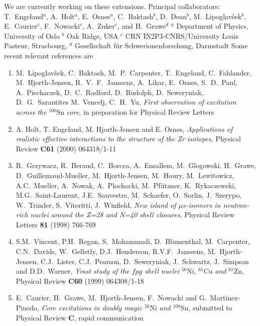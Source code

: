 We are currently working on these extensions. 
\newline\newline 
Principal collaborators: T.\ Engeland$^a$, 
A.\ Holt$^a$, E.\ Osnes$^a$, C.\ Baktash$^b$, D.\ Dean$^b$, M.\ Lipoglav\v{s}ek$^b$, E.\ Caurier$^c$, F.~Nowacki$^c$, A.\ Zuker$^c$, 
and H.\ Grawe$^d$\newline
${}^a$ Department of Physics,
University of Oslo\newline
${}^b$ Oak Ridge, USA\newline
${}^c$ CRN IN2P3-CNRS/University Louis Pasteur, Strasbourg, \newline
${}^d$ Gesellschaft f\"ur Schwerionenforschung,
Darmstadt\newline\newline
Some recent relevant references are
\begin{enumerate}
\item 
M.~Lipoglav\v{s}ek, C.~Baktash,
M.~P.~Carpenter, T.~Engeland, C.~Fahlander,
M.~Hjorth-Jensen, R.~V.~F.~Janssens, A.~Likar,
E.~Osnes, S.~D.~Paul, A.~Piechaczek, D.~C.~Radford,
D.~Rudolph, D.~Seweryniak, D.~G.~Sarantites M.~Vencelj, C.~H.~Yu,
{\em First observation of excitation across the} $^{100}$Sn 
{\em core}, in preparation
for Physical Review Letters
\item
    A. Holt, T. Engeland, M. Hjorth-Jensen and E. Osnes,
    {\em Applications of realistic effective interactions to the structure
         of the Zr isotopes},
    Physical Review {\bf C61} (2000) 064318/1-11
\item 
    R.\ Grzywacz, R.\ Beraud, C.\ Borcea, A.\ Ensallem, M.\ Glogowski,  H.\ Grawe, D.\ Guillemaud-Mueller, M.\ Hjorth-Jensen, M.\ Houry,
  M.\ Lewitowicz, A.C.\ Mueller, A.\ Nowak, A.\ Plochocki, 
  M.\ Pf\"utzner, K.\ Rykaczewski, M.G.\ Saint-Laurent, J.E.\ Sauvestre, M.\ Schaefer, O.\ Sorlin, J.\ Szerypo, W.\ Trinder, S.\ Viteritti, J.\ Winfield,
  {\em New island of $\mu s$-isomers in neutron-rich nuclei around the
  Z=28 and N=40 shell closures}, 
  Physical Review Letters {\bf 81} (1998) 766-769 
\item S.M.\ Vincent, P.H.\ Regan, S.\ Mohammadi, D.\ Blumenthal,
      M.\ Carpenter, C.N.\ Davids, W.\ Gelletly, D.J.\ Henderson,
      R.V.F.\ Janssens, M.\ Hjorth-Jensen, C.J.\ Lister, C.J.\ Pearson,
      D.\ Seweryniak, J.\ Schwartz, J.\ Simpson and D.D.\ Warner,
      {\em Yrast study of the $fpg$ shell nuclei} $^{56}$Ni, $^{61}$Cu
      {\em and} $^{61}$Zn,  Physical Review {\bf C60} (1999) 064308/1-18

\item E.\ Caurier, H.\ Grawe, M.\ Hjorth-Jensen, F.\ Nowacki and G.\ 
      Martinez-Pinedo, {\em Core excitations in doubly magic} $^{56}$Ni
      {\em and}  $^{100}$Sn, submitted to Physical Review {\bf C}, rapid communication

\end{enumerate}



